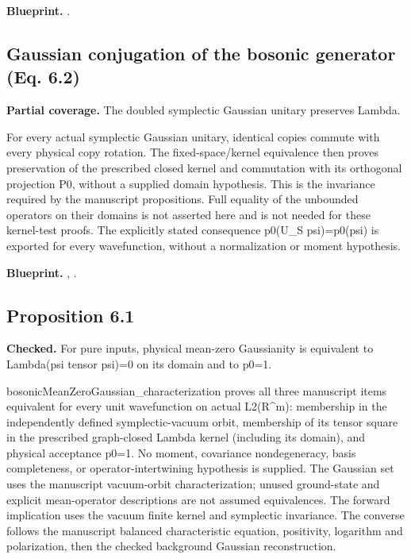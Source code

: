 \textbf{Blueprint.} .

\subsection{Gaussian conjugation of the bosonic generator (Eq. 6.2)}\label{paper:boson-invariance}
\textbf{Partial coverage.} The doubled symplectic Gaussian unitary preserves Lambda. 

For every actual symplectic Gaussian unitary, identical copies commute with every physical copy rotation. The fixed-space/kernel equivalence then proves preservation of the prescribed closed kernel and commutation with its orthogonal projection P0, without a supplied domain hypothesis. This is the invariance required by the manuscript propositions. Full equality of the unbounded operators on their domains is not asserted here and is not needed for these kernel-test proofs. The explicitly stated consequence p0(U\_S psi)=p0(psi) is exported for every wavefunction, without a normalization or moment hypothesis.


\textbf{Blueprint.} , .

\subsection{Proposition 6.1}\label{paper:r6-1}
\textbf{Checked.} For pure inputs, physical mean-zero Gaussianity is equivalent to Lambda(psi tensor psi)=0 on its domain and to p0=1. 

bosonicMeanZeroGaussian\_characterization proves all three manuscript items equivalent for every unit wavefunction on actual L2(R\textasciicircum{}m): membership in the independently defined symplectic-vacuum orbit, membership of its tensor square in the prescribed graph-closed Lambda kernel (including its domain), and physical acceptance p0=1. No moment, covariance nondegeneracy, basis completeness, or operator-intertwining hypothesis is supplied. The Gaussian set uses the manuscript vacuum-orbit characterization; unused ground-state and explicit mean-operator descriptions are not assumed equivalences. The forward implication uses the vacuum finite kernel and symplectic invariance. The converse follows the manuscript balanced characteristic equation, positivity, logarithm and polarization, then the checked background Gaussian reconstruction.

